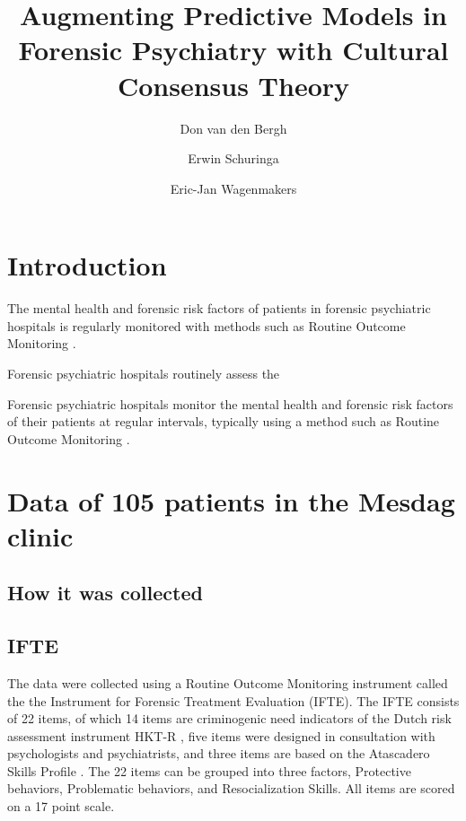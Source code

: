 \documentclass[a4paper,11pt]{article}
\title{Augmenting Predictive Models in Forensic Psychiatry with Cultural Consensus Theory}
\author[1]{Don van den Bergh}
\author[2]{Erwin Schuringa}
\author[1]{Eric-Jan Wagenmakers}
\affil[1]{Department of Psychological Methods, University of Amsterdam}
\affil[2]{Forensic Psychiatric Centre Dr. S. van Mesdag}
\date{}
\begin{document}
\maketitle

\tableofcontents

\begin{abstract}

\end{abstract}

\section{Introduction}
The mental health and forensic risk factors of patients in forensic psychiatric hospitals is regularly monitored with methods such as
Routine Outcome Monitoring \parencite{deBeurs2011ROM}.

Forensic psychiatric hospitals routinely assess the

Forensic psychiatric hospitals monitor the mental health and forensic risk factors of their patients at regular intervals, typically using a method such as Routine Outcome Monitoring \parencite{deBeurs2011ROM}.

\section{Data of 105 patients in the Mesdag clinic}
\subsection{How it was collected}
\subsection{IFTE}

The data were collected using a Routine Outcome Monitoring instrument called the the Instrument for Forensic Treatment Evaluation (IFTE).
The IFTE consists of 22 items, of which 14 items are criminogenic need indicators of the Dutch risk assessment instrument HKT-R \parencite{spreen2013handleiding}, five items were designed in consultation with psychologists and psychiatrists, and three items are based on the Atascadero Skills Profile \parencite{vess2001development}.
The 22 items can be grouped into three factors, Protective behaviors, Problematic behaviors, and Resocialization Skills.
All items are scored on a 17 point scale.
\end{document}
